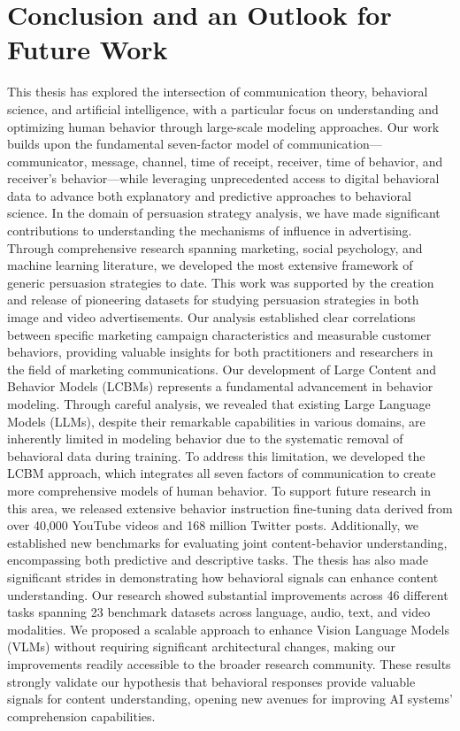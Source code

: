 \chapter{Conclusion and an Outlook for Future Work}
\label{chapter:conclusion}


This thesis has explored the intersection of communication theory, behavioral science, and artificial intelligence, with a particular focus on understanding and optimizing human behavior through large-scale modeling approaches. Our work builds upon the fundamental seven-factor model of communication—communicator, message, channel, time of receipt, receiver, time of behavior, and receiver's behavior—while leveraging unprecedented access to digital behavioral data to advance both explanatory and predictive approaches to behavioral science.
In the domain of persuasion strategy analysis, we have made significant contributions to understanding the mechanisms of influence in advertising. Through comprehensive research spanning marketing, social psychology, and machine learning literature, we developed the most extensive framework of generic persuasion strategies to date. This work was supported by the creation and release of pioneering datasets for studying persuasion strategies in both image and video advertisements. Our analysis established clear correlations between specific marketing campaign characteristics and measurable customer behaviors, providing valuable insights for both practitioners and researchers in the field of marketing communications.
Our development of Large Content and Behavior Models (LCBMs) represents a fundamental advancement in behavior modeling. Through careful analysis, we revealed that existing Large Language Models (LLMs), despite their remarkable capabilities in various domains, are inherently limited in modeling behavior due to the systematic removal of behavioral data during training. To address this limitation, we developed the LCBM approach, which integrates all seven factors of communication to create more comprehensive models of human behavior. To support future research in this area, we released extensive behavior instruction fine-tuning data derived from over 40,000 YouTube videos and 168 million Twitter posts. Additionally, we established new benchmarks for evaluating joint content-behavior understanding, encompassing both predictive and descriptive tasks.
The thesis has also made significant strides in demonstrating how behavioral signals can enhance content understanding. Our research showed substantial improvements across 46 different tasks spanning 23 benchmark datasets across language, audio, text, and video modalities. We proposed a scalable approach to enhance Vision Language Models (VLMs) without requiring significant architectural changes, making our improvements readily accessible to the broader research community. These results strongly validate our hypothesis that behavioral responses provide valuable signals for content understanding, opening new avenues for improving AI systems' comprehension capabilities.
